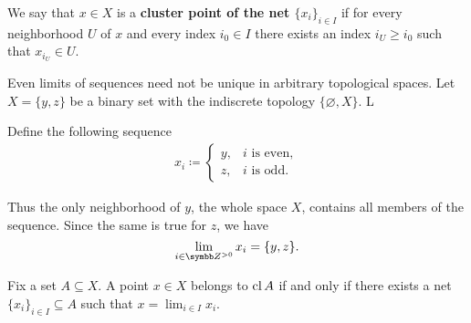 \begin{definition}\label{def:net_cluster_point}\cite[50]{Engelking1989}
  We say that \( x \in X \) is a \textbf{cluster point of the net \( \{ x_i \}_{i \in I} \)} if for every neighborhood \( U \) of \( x \) and every index \( i_0 \in I \) there exists an index \( i_U \geq i_0 \) such that \( x_{i_U} \in U \).
\end{definition}

\begin{example}\label{ex:multiple_limit_points_of_net}
  Even limits of sequences need not be unique in arbitrary topological spaces. Let \( X = \{ y, z \} \) be a binary set with the indiscrete topology \( \{ \varnothing, X \} \). L

  Define the following sequence
  \begin{align*}
    x_i \coloneqq \begin{cases}
      y, &i \text{ is even}, \\
      z, &i \text{ is odd}.
    \end{cases}
  \end{align*}

  Thus the only neighborhood of \( y \), the whole space \( X \), contains all members of the sequence. Since the same is true for \( z \), we have
  \begin{equation*}
    \lim_{i \in \Z^{>0}} x_i = \{ y, z \}.
  \end{equation*}
\end{example}

\begin{proposition}\label{thm:limit_point_iff_in_closure}\cite[proposition 1.6.3]{Engelking1989}
  Fix a set \( A \subseteq X \). A point \( x \in X \) belongs to \( \operatorname{cl}{A} \) if and only if there exists a net \( \{ x_i \}_{i \in I} \subseteq A \) such that \( x = \lim_{i \in I} x_i \).
\end{proposition}
